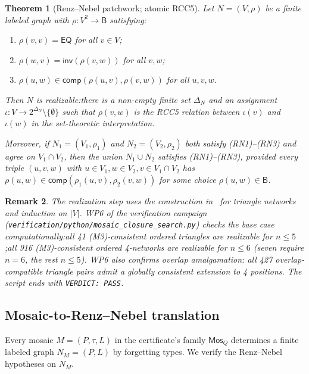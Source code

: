 \documentclass[11pt]{article}
\newtheorem{theorem}{Theorem}[section]
\newtheorem{remark}[theorem]{Remark}
\newcommand{\EQ}{\mathsf{EQ}}
\newcommand{\Base}{\mathsf{B}}
\newcommand{\Inv}{\mathsf{inv}}
\newcommand{\comp}{\mathsf{comp}}
\newcommand{\Mos}{\mathsf{Mos}}
\begin{document}
\begin{theorem}[Renz--Nebel patchwork; atomic RCC5]\label{thm:RN}
Let \(N = (V, \rho)\) be a finite labeled graph with
\(\rho:V^2 \to \Base\) satisfying:
\begin{enumerate}[label=\textnormal{(RN\arabic*)}, leftmargin=3em]
  \item \(\rho(v,v) = \EQ\) for all \(v \in V\);
  \item \(\rho(w,v) = \Inv(\rho(v,w))\) for all \(v,w\);
  \item \(\rho(u,w) \in \comp(\rho(u,v), \rho(v,w))\) for all
    \(u,v,w\).
\end{enumerate}
Then \(N\) is realizable:\@ there is a non-empty finite set
\(\Delta_N\) and an assignment
\(\iota:V \to 2^{\Delta_N} \setminus \{\emptyset\}\) such that
\(\rho(v,w)\) is the RCC5 relation between \(\iota(v)\) and
\(\iota(w)\) in the set-theoretic interpretation.

Moreover, if \(N_1 = (V_1, \rho_1)\) and \(N_2 = (V_2, \rho_2)\)
both satisfy \textnormal{(RN1)--(RN3)} and agree on \(V_1 \cap V_2\),
then the union \(N_1 \cup N_2\) satisfies \textnormal{(RN1)--(RN3)},
provided every triple \((u,v,w)\) with \(u \in V_1, w \in V_2,
v \in V_1 \cap V_2\) has \(\rho(u,w) \in \comp(\rho_1(u,v),
\rho_2(v,w))\) for some choice
\(\rho(u,w) \in \Base\).
\end{theorem}

\begin{remark}
The realization step uses the construction in~\cite[\S5]{RenzNebel1999}
for triangle networks and induction on \(|V|\).  WP6 of the
verification campaign
(\texttt{verification/python/mosaic\_closure\_search.py}) checks the
base case computationally:\@ all 41 (M3)-consistent ordered triangles
are realizable for \(n \le 5\);\@ all 916 (M3)-consistent ordered
4-networks are realizable for \(n \le 6\) (seven require \(n = 6\),
the rest \(n \le 5\)).  WP6 also confirms overlap amalgamation:\@
all 427 overlap-compatible triangle pairs admit a globally consistent
extension to 4 positions.  The script ends with
\texttt{VERDICT: PASS}.
\end{remark}

\subsection{Mosaic-to-Renz--Nebel translation}

Every mosaic \(M = (P,\tau,L)\) in the certificate's family
\(\Mos_Q\) determines a finite labeled graph \(N_M = (P, L)\) by
forgetting types.  We verify the Renz--Nebel hypotheses on
\(N_M\).
\end{document}
